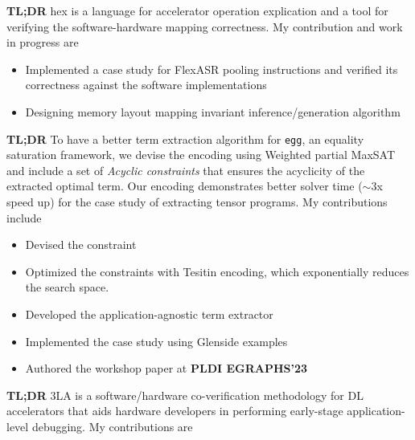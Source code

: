 \documentclass{resume}
\begin{document}
\textbf{TL;DR} hex is a language for accelerator operation explication and a tool for verifying the software-hardware mapping correctness. My contribution and work in progress are
\begin{itemize}
    \item Implemented a case study for FlexASR pooling instructions and verified its correctness against the software implementations
    \item Designing memory layout mapping invariant inference/generation algorithm
\end{itemize}
\textbf{TL;DR} To have a better term extraction algorithm for \texttt{egg}, an equality saturation framework, we devise the encoding using Weighted partial MaxSAT and include a set of \textit{Acyclic constraints} that ensures the acyclicity of the extracted optimal term. Our encoding demonstrates better solver time ($\sim$3x speed up) for the case study of extracting tensor programs. My contributions include
\begin{itemize}
    \item Devised the constraint
    \item Optimized the constraints with Tesitin encoding, which exponentially reduces the search space.
    \item Developed the application-agnostic term extractor
    \item Implemented the case study using Glenside examples
    \item Authored the workshop paper at \textbf{PLDI EGRAPHS'23}
\end{itemize}
\textbf{TL;DR} 3LA is a software/hardware co-verification methodology for DL accelerators that aids hardware developers in performing early-stage application-level debugging. My contributions are
\end{document}
